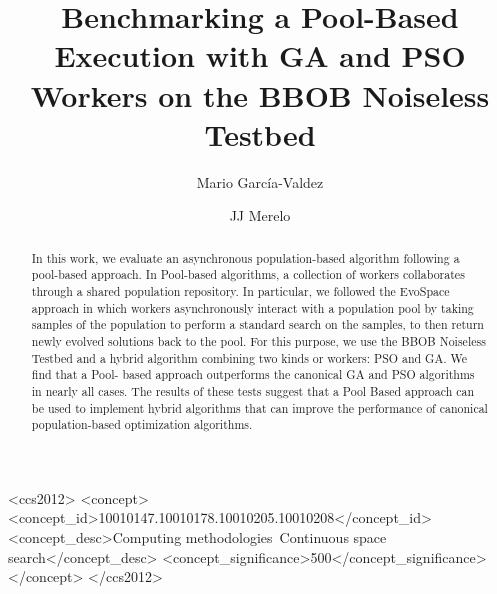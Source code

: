 \documentclass[sigconf]{acmart}
\begin{document}
\title[Benchmarking an Asynchronous Pool-Based Execution with GA and PSO Workers] 
{Benchmarking a Pool-Based Execution with GA and PSO Workers on the BBOB Noiseless Testbed}


\author{Mario Garc\'ia-Valdez}

\author{JJ Merelo}

\renewcommand{\shortauthors}{Mario Garc\'ia-Valdez and JJ Merelo}


\begin{abstract}

  In this work, we evaluate an asynchronous population-based
algorithm following a pool-based approach. In Pool-based algorithms, a
collection of workers collaborates through a shared population repository. In
particular, we followed the EvoSpace approach in which workers asynchronously
interact with a population pool by taking samples of the population to perform a
standard search on the samples, to then return newly evolved solutions back to
the pool. For this purpose, we use the BBOB Noiseless Testbed and a hybrid
algorithm combining two kinds or workers:  PSO  and GA. We find that a Pool-
based approach outperforms the canonical GA and PSO algorithms in nearly all
cases. The results of these tests suggest that a Pool Based approach can be used
to implement hybrid algorithms that can improve the performance of canonical
population-based optimization algorithms. \end{abstract}


%
%
 \begin{CCSXML}
<ccs2012>
<concept>
<concept_id>10010147.10010178.10010205.10010208</concept_id>
<concept_desc>Computing methodologies~Continuous space search</concept_desc>
<concept_significance>500</concept_significance>
</concept>
</ccs2012>
\end{CCSXML}

\end{document}
